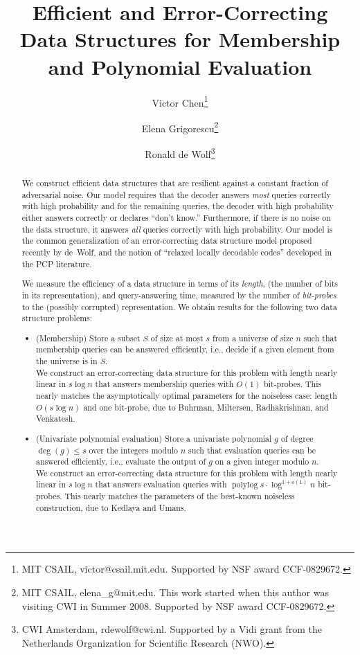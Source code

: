 \documentclass[11pt,english]{article}
\date{}
\theoremstyle{definition}
\theoremstyle{remark}
\newcommand{\polylog}{\operatorname{polylog} }
\begin{document}
\title{Efficient and Error-Correcting Data Structures for Membership and
Polynomial Evaluation}


\author{Victor Chen\thanks{MIT CSAIL, victor@csail.mit.edu. Supported by NSF award CCF-0829672. } \and Elena Grigorescu\thanks{MIT CSAIL, elena\_g@mit.edu. This work started when this author was
visiting CWI in Summer 2008. Supported by NSF award CCF-0829672. } \and Ronald de Wolf\thanks{CWI Amsterdam, rdewolf@cwi.nl. Supported by a Vidi grant
from the Netherlands Organization for Scientific Research (NWO).
}}


\maketitle
\setcounter{page}{0} 
\begin{abstract}
We construct efficient data structures that are resilient against
a constant fraction of adversarial noise. Our model requires that
the decoder answers \emph{most} queries correctly with high probability
and for the remaining queries, the decoder with high probability either
answers correctly or declares ``don't know.'' Furthermore, if
there is no noise on the data structure, it answers \emph{all} queries
correctly with high probability. Our model is the common generalization
of an error-correcting data structure model proposed recently by de~Wolf, 
and the notion of ``relaxed locally decodable codes'' developed in the PCP literature.

We measure the efficiency of a data structure in terms of its \emph{length},
(the number of bits in its representation), and query-answering
time, measured by the number of \emph{bit-probes} to the (possibly corrupted)
representation. We obtain results for the following two data structure problems: 
\begin{itemize}
\item (Membership) Store a subset $S$ of size at most $s$ from a universe
of size $n$ such that membership queries can be answered efficiently,
i.e., decide if a given element from the universe is in $S$. \\
 We construct an error-correcting data structure for this problem
with length nearly linear in $s\log n$ that answers membership queries
with $O(1)$ bit-probes. This nearly matches the asymptotically optimal
parameters for the noiseless case: length $O(s\log n)$ and one bit-probe,
due to Buhrman, Miltersen, Radhakrishnan, and Venkatesh. 
\item (Univariate polynomial evaluation) Store a univariate polynomial $g$
of degree $\deg(g)\leq s$ over the integers modulo $n$ such that
evaluation queries can be answered efficiently, i.e., evaluate the
output of $g$ on a given integer modulo $n$. \\
 We construct an error-correcting data structure for this problem
with length nearly linear in $s\log n$ that answers evaluation queries
with $\polylog s\cdot\log^{1+o(1)}n$ bit-probes. This nearly matches
the parameters of the best-known noiseless construction, due to Kedlaya
and Umans.
\end{itemize}

\end{abstract}
\thispagestyle{empty} \newpage{}
\end{document}
